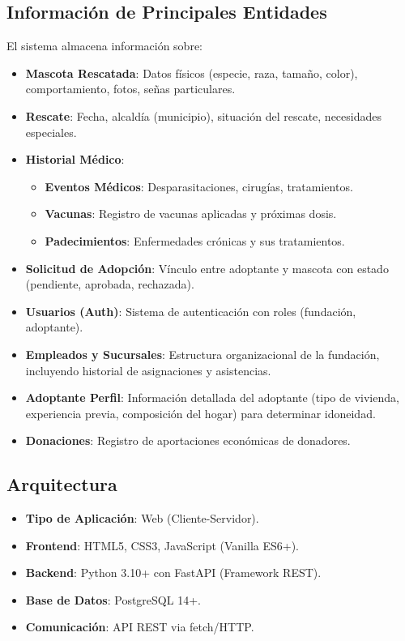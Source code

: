 \documentclass[12pt,a4paper]{article}
\begin{document}
\subsection{Información de Principales Entidades}
El sistema almacena información sobre:
\begin{itemize}
    \item \textbf{Mascota Rescatada}: Datos físicos (especie, raza, tamaño, color), comportamiento, fotos, señas particulares.
    \item \textbf{Rescate}: Fecha, alcaldía (municipio), situación del rescate, necesidades especiales.
    \item \textbf{Historial Médico}: 
    \begin{itemize}
        \item \textbf{Eventos Médicos}: Desparasitaciones, cirugías, tratamientos.
        \item \textbf{Vacunas}: Registro de vacunas aplicadas y próximas dosis.
        \item \textbf{Padecimientos}: Enfermedades crónicas y sus tratamientos.
    \end{itemize}
    \item \textbf{Solicitud de Adopción}: Vínculo entre adoptante y mascota con estado (pendiente, aprobada, rechazada).
    \item \textbf{Usuarios (Auth)}: Sistema de autenticación con roles (fundación, adoptante).
    \item \textbf{Empleados y Sucursales}: Estructura organizacional de la fundación, incluyendo historial de asignaciones y asistencias.
    \item \textbf{Adoptante Perfil}: Información detallada del adoptante (tipo de vivienda, experiencia previa, composición del hogar) para determinar idoneidad.
    \item \textbf{Donaciones}: Registro de aportaciones económicas de donadores.
\end{itemize}

\subsection{Arquitectura}
\begin{itemize}
    \item \textbf{Tipo de Aplicación}: Web (Cliente-Servidor).
    \item \textbf{Frontend}: HTML5, CSS3, JavaScript (Vanilla ES6+).
    \item \textbf{Backend}: Python 3.10+ con FastAPI (Framework REST).
    \item \textbf{Base de Datos}: PostgreSQL 14+.
    \item \textbf{Comunicación}: API REST via fetch/HTTP.
\end{itemize}
\end{document}
